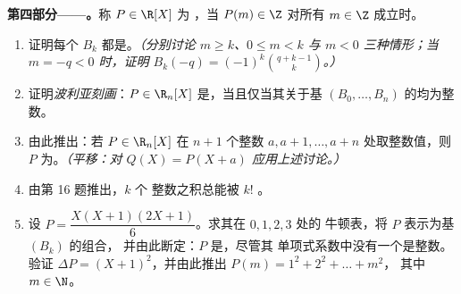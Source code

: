 \begin{problem}
\medskip
\noindent\textbf{第四部分——。}称 $P \in \R[X]$ 为
\emph{}，当 $P(m) \in
\Z$ 对所有 $m \in \Z$ 成立时。
\begin{enumerate}[resume]
  \item 证明每个 $B_k$ 都是。\emph{（分别讨论 $m
        \geq k$、$0 \leq m < k$ 与 $m < 0$ 三种情形；当 $m =
        -q < 0$ 时，证明 $B_k(-q) = (-1)^k \binom{q + k - 1}{k}$。）}
  \item 证明\emph{波利亚刻画}：$P \in \R_n[X]$
        是，当且仅当其关于基
        $(B_0, \dots, B_n)$ 的均为整数。
  \item 由此推出：若 $P \in \R_n[X]$ 在 $n + 1$
        个\emph{}整数 $a, a+1, \dots, a+n$ 处取整数值，则 $P$
        为。\emph{（平移：对 $Q(X)
        = P(X + a)$ 应用上述讨论。）}
  \item 由第 16 题推出，$k$ 个
        整数之积总能被 $k!$ 。
  \item 设 $P = \dfrac{X(X+1)(2X+1)}{6}$。求其在 $0, 1, 2, 3$ 处的
        牛顿表，将 $P$ 表示为基 $(B_k)$ 的组合，
        并由此断定：$P$ 是，尽管其
        单项式系数中没有一个是整数。验证 $\Delta P =
        (X+1)^2$，并由此推出 $P(m) = 1^2 + 2^2 + \dots + m^2$，
        其中 $m \in \N$。
\end{enumerate}


\end{problem}
